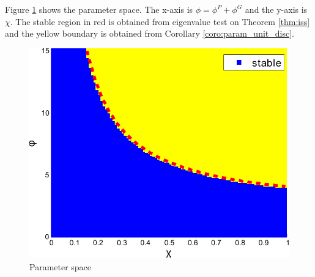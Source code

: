 Figure \ref{fig:paramSpace} shows the parameter space.
The x-axis is $ \phi = \phi^{P} + \phi^{G} $ and the y-axis is $ \chi $.
The stable region in red is obtained from eigenvalue test on Theorem \ref{thm:iss} and the yellow boundary is obtained from Corollary \ref{coro:param_unit_disc}.
\begin{figure}
\centering
\includegraphics[width=0.5\linewidth]{./fig/param2}
\caption{Parameter space}
\label{fig:paramSpace}
\end{figure}

